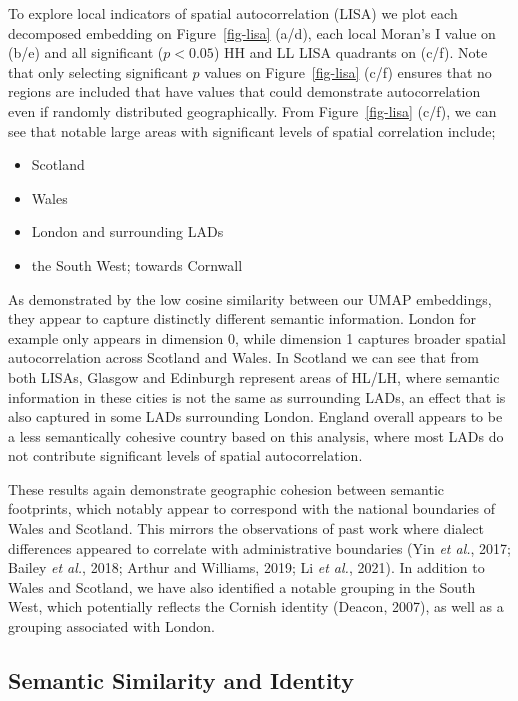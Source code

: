 \documentclass[
]{article}
\providecommand{\tightlist}{%
  \setlength{\itemsep}{0pt}\setlength{\parskip}{0pt}}\usepackage{longtable,booktabs,array}
\begin{document}
To explore local indicators of spatial autocorrelation (LISA) we plot
each decomposed embedding on Figure~\ref{fig-lisa} (a/d), each local
Moran's I value on (b/e) and all significant (\(p<0.05\)) HH and LL LISA
quadrants on (c/f). Note that only selecting significant \(p\) values on
Figure~\ref{fig-lisa} (c/f) ensures that no regions are included that
have values that could demonstrate autocorrelation even if randomly
distributed geographically. From Figure~\ref{fig-lisa} (c/f), we can see
that notable large areas with significant levels of spatial correlation
include;

\begin{itemize}
\tightlist
\item
  Scotland
\item
  Wales
\item
  London and surrounding LADs
\item
  the South West; towards Cornwall
\end{itemize}

As demonstrated by the low cosine similarity between our UMAP
embeddings, they appear to capture distinctly different semantic
information. London for example only appears in dimension 0, while
dimension 1 captures broader spatial autocorrelation across Scotland and
Wales. In Scotland we can see that from both LISAs, Glasgow and
Edinburgh represent areas of HL/LH, where semantic information in these
cities is not the same as surrounding LADs, an effect that is also
captured in some LADs surrounding London. England overall appears to be
a less semantically cohesive country based on this analysis, where most
LADs do not contribute significant levels of spatial autocorrelation.

These results again demonstrate geographic cohesion between semantic
footprints, which notably appear to correspond with the national
boundaries of Wales and Scotland. This mirrors the observations of past
work where dialect differences appeared to correlate with administrative
boundaries (Yin \emph{et al.}, 2017; Bailey \emph{et al.}, 2018; Arthur
and Williams, 2019; Li \emph{et al.}, 2021). In addition to Wales and
Scotland, we have also identified a notable grouping in the South West,
which potentially reflects the Cornish identity (Deacon, 2007), as well
as a grouping associated with London.

\subsection{Semantic Similarity and
Identity}\label{semantic-similarity-and-identity}
\end{document}
